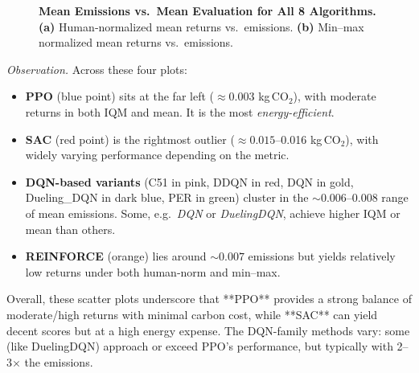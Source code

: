 \begin{figure}[htbp]
	\centering
	\quad
	\caption{\textbf{Mean Emissions vs.\ Mean Evaluation for All 8 Algorithms.}
		\textbf{(a)} Human‐normalized mean returns vs.\ emissions. 
		\textbf{(b)} Min--max normalized mean returns vs.\ emissions.}
	\label{fig:scatter_all_mean}
\end{figure}

\noindent
\emph{Observation.} Across these four plots:
\begin{itemize}
	\item \textbf{PPO} (blue point) sits at the far left (\(\approx 0.003\) kg\,CO$_2$), 
	with moderate returns in both IQM and mean. It is the most \emph{energy-efficient}.
	\item \textbf{SAC} (red point) is the rightmost outlier (\(\approx 0.015\)–0.016 kg\,CO$_2$), 
	with widely varying performance depending on the metric. 
	\item \textbf{DQN-based variants} (C51 in pink, DDQN in red, DQN in gold,
	Dueling\_DQN in dark blue, PER in green) cluster in the \(\sim0.006\)--0.008 range
	of mean emissions. Some, e.g.\ \emph{DQN} or \emph{DuelingDQN}, achieve higher 
	IQM or mean than others. 
	\item \textbf{REINFORCE} (orange) lies around \(\sim0.007\) emissions but yields 
	relatively low returns under both human‐norm and min–max.
\end{itemize}
Overall, these scatter plots underscore that **PPO** provides a strong balance of 
moderate/high returns with minimal carbon cost, while **SAC** can yield decent 
scores but at a high energy expense. The DQN-family methods vary: some (like 
DuelingDQN) approach or exceed PPO’s performance, but typically with 2--3$\times$ 
the emissions.

